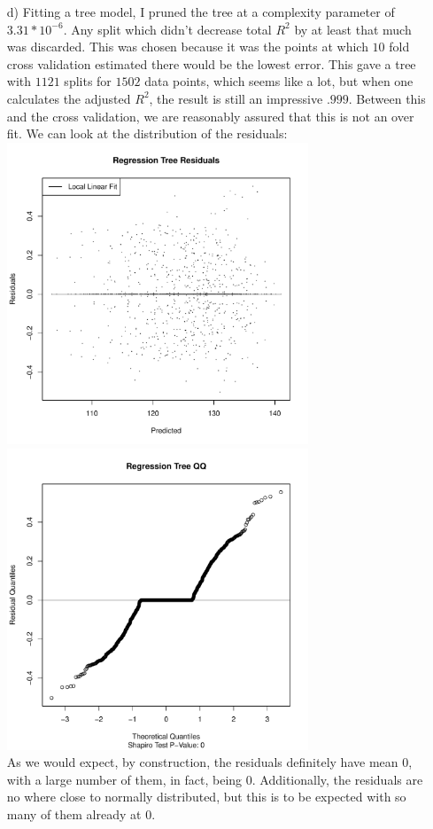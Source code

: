 \documentclass[11pt]{article}
\theoremstyle{definition}
\begin{document}
\begin{itemize}
\begin{itemize}
            \item[d)]
                Fitting a tree model, I pruned the tree at a complexity parameter of $3.31*10^{-6}$. Any split which didn't decrease total $R^2$ by at least that much was discarded. This was chosen because it was the points at which $10$ fold cross validation estimated there would be the lowest error. This gave a tree with $1121$ splits for $1502$ data points, which seems like a lot, but when one calculates the adjusted $R^2$, the result is still an impressive $.999$. Between this and the cross validation, we are reasonably assured that this is not an over fit. We can look at the distribution of the residuals:\\
                \includegraphics[width=9cm]{final/1d_res_plot_tree} 
                \includegraphics[width=9cm]{final/1d_qq_tree} \\
                As we would expect, by construction, the residuals definitely have mean $0$, with a large number of them, in fact, being $0$. Additionally, the residuals are no where close to normally distributed, but this is to be expected with so many of them already at $0$.

\end{itemize}
\end{itemize}
\end{document}
